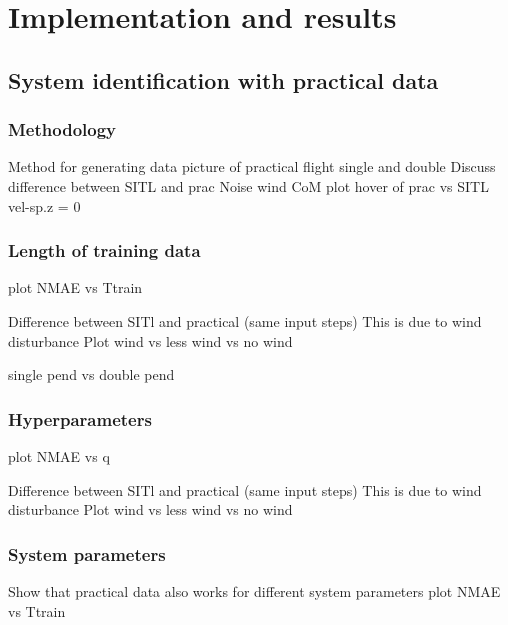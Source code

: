 \graphicspath{{results/fig/}}

\chapter{Implementation and results}
\label{chap:results}

    \section{System identification with practical data}

        \subsection{Methodology}
            Method for generating data
            picture of practical flight single and double
            Discuss difference between SITL and prac
                Noise 
                wind
                CoM
            plot hover of prac vs SITL vel-sp.z = 0

        \subsection{Length of training data}
            plot NMAE vs Ttrain
            
            

            Difference between SITl and practical (same input steps)
            This is due to wind disturbance
            Plot wind vs less wind vs no wind

            single pend vs double pend

        \subsection{Hyperparameters}
            plot NMAE vs q
            

            
            
            Difference between SITl and practical (same input steps)
            This is due to wind disturbance
            Plot wind vs less wind vs no wind
            
        \subsection{System parameters}
            Show that practical data also works for different system parameters
            plot NMAE vs Ttrain


